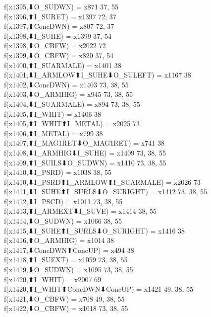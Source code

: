 f(x1395,⬇O_SUDWN) = x871 {37, 55} \\
f(x1396,⬆I_SURET) = x1397 {72, 37} \\
f(x1397,⬆ConcDWN) = x807 {72, 37} \\
f(x1398,⬇I_SUHE) = x1399 {37, 54} \\
f(x1398,⬇O_CBFW) = x2022 {72} \\
f(x1399,⬇O_CBFW) = x820 {37, 54} \\
f(x1400,⬆I_SUARMALE) = x1401 {38} \\
f(x1401,⬇I_ARMLOW⬆I_SUHE⬇O_SULEFT) = x1167 {38} \\
f(x1402,⬇ConcDWN) = x1403 {73, 38, 55} \\
f(x1403,⬇O_ARMHIG) = x945 {73, 38, 55} \\
f(x1404,⬇I_SUARMALE) = x894 {73, 38, 55} \\
f(x1405,⬆I_WHIT) = x1406 {38} \\
f(x1405,⬆I_WHIT⬆I_METAL) = x2025 {73} \\
f(x1406,⬆I_METAL) = x799 {38} \\
f(x1407,⬆I_MAG1RET⬇O_MAG1RET) = x741 {38} \\
f(x1408,⬇I_ARMHIG⬇I_SUHE) = x1409 {73, 38, 55} \\
f(x1409,⬆I_SUILS⬇O_SUDWN) = x1410 {73, 38, 55} \\
f(x1410,⬇I_PSRD) = x1038 {38, 55} \\
f(x1410,⬇I_PSRD⬆I_ARMLOW⬆I_SUARMALE) = x2026 {73} \\
f(x1411,⬇I_SUHE⬆I_SURLS⬇O_SURIGHT) = x1412 {73, 38, 55} \\
f(x1412,⬇I_PSCD) = x1011 {73, 38, 55} \\
f(x1413,⬆I_ARMEXT⬇I_SUVE) = x1414 {38, 55} \\
f(x1414,⬇O_SUDWN) = x1066 {38, 55} \\
f(x1415,⬇I_SUHE⬆I_SURLS⬇O_SURIGHT) = x1416 {38} \\
f(x1416,⬆O_ARMHIG) = x1014 {38} \\
f(x1417,⬇ConcDWN⬆ConcUP) = x494 {38} \\
f(x1418,⬆I_SUEXT) = x1059 {73, 38, 55} \\
f(x1419,⬇O_SUDWN) = x1095 {73, 38, 55} \\
f(x1420,⬆I_WHIT) = x2007 {69} \\
f(x1420,⬆I_WHIT⬆ConcDWN⬇ConcUP) = x1421 {49, 38, 55} \\
f(x1421,⬇O_CBFW) = x708 {49, 38, 55} \\
f(x1422,⬇O_CBFW) = x1018 {73, 38, 55} \\
